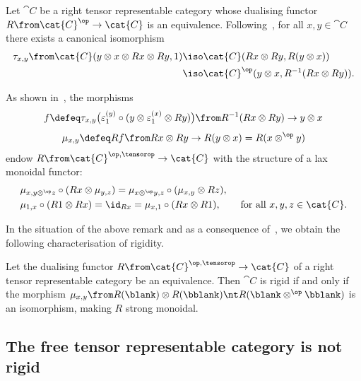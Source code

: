 \begin{remark}
  Let \(\cat{C}\) be a right tensor representable category whose dualising functor \(R \from\cat{C}^{\op} \to\cat{C}\) is an equivalence.
  Following~\cite[Section~4]{boyarchenko13:groth-verdier},
  for all \(x,y \in\cat{C}\) there exists a canonical isomorphism
  \begin{align*}
    \tau_{x,y}\from \cat{C}(y\otimes x\otimes Rx \otimes Ry, 1)
    &\iso \cat{C}(Rx \otimes Ry, R(y \otimes x)) \\
    &\iso \cat{C}^{\op}(y \otimes x, R^{-1}(Rx \otimes Ry)).
  \end{align*}

  As shown in~\cite[Lemma~4.1 and Remark~4.2]{boyarchenko13:groth-verdier},
  the morphisms
  \[
    f \defeq \tau_{x,y}\big(\varepsilon^{(y)}_1 \circ (y \otimes \varepsilon^{(x)}_1 \otimes Ry)\big)\from R^{-1}(Rx \otimes Ry) \to y \otimes x
  \]
  \[
    \mu_{x,y} \defeq Rf \from Rx \otimes Ry \to R(y \otimes x) = R(x \otimes^{\op} y)
  \]
  endow \(R\from\cat{C}^{\op,\tensorop} \to\cat{C}\) with the structure of a lax monoidal functor:
  \begin{align*}
    &\mu_{x, y \otimes^{\op} z} \circ (Rx \otimes \mu_{y,z}) = \mu_{x \otimes^{\op} y, z} \circ (\mu_{x,y}\otimes Rz), \\
    &\mu_{1,x} \circ (R1 \otimes Rx) = \id_{Rx} = \mu_{x,1} \circ (Rx \otimes R1),
      \qquad\text{for all \(x,y,z \in\cat{C}\)}.
  \end{align*}
\end{remark}

In the situation of the above remark and
as a consequence of~\cite[Proposition~4.4]{boyarchenko13:groth-verdier},
we obtain the following characterisation of rigidity.

\begin{proposition}\label{prop:GV-rigid-characterisation}
  Let the dualising functor \(R \from\cat{C}^{\op, \tensorop} \to\cat{C}\) of a right tensor representable category be an equivalence.
  Then \(\cat{C}\) is rigid if and only if the morphism
  \(\mu_{x,y} \from R(\blank) \otimes R(\bblank) \nt R(\blank \otimes^{\op} \bblank)\) is an isomorphism,
  making \(R\) strong monoidal.
\end{proposition}

\subsection{The free tensor representable category is not rigid}\label{sec:negative}

